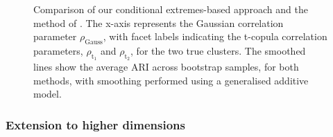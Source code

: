 \documentclass[12pt,compact]{article}
\newcommand{\rhou}[1]{\rho_{\text{#1}}}
\begin{document}
\begin{figure}[htb]
{{    Comparison of our conditional extremes-based approach and the method of \citet{Vignotto2021}.
    The x-axis represents the Gaussian correlation parameter $\rhou{Gauss}$, with facet labels indicating the t-copula correlation parameters, $\rho_{\text{t}_1}$ and $\rho_{\text{t}_2}$, for the two true clusters.
    The smoothed lines show the average ARI across bootstrap samples, for both methods, with smoothing performed using a generalised additive model.
    }}
    \label{fig:01_ce_vs_vi}
\end{figure}

\subsubsection{Extension to higher dimensions}
\label{subsubsec:sim_extension}
\end{document}
